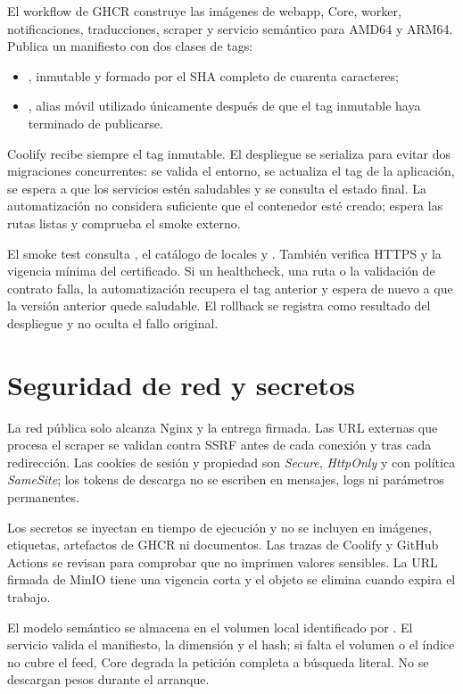 El workflow de GHCR construye las imágenes de webapp, Core, worker, notificaciones, traducciones, scraper y servicio semántico para AMD64 y ARM64. Publica un manifiesto con dos clases de tags:

\begin{itemize}
  \item {}, inmutable y formado por el SHA completo de cuarenta caracteres;
  \item {}, alias móvil utilizado únicamente después de que el tag inmutable haya terminado de publicarse.
\end{itemize}

Coolify recibe siempre el tag inmutable. El despliegue se serializa para evitar dos migraciones concurrentes: se valida el entorno, se actualiza el tag de la aplicación, se espera a que los servicios estén saludables y se consulta el estado final. La automatización no considera suficiente que el contenedor esté creado; espera las rutas listas y comprueba el smoke externo.

El smoke test consulta , el catálogo de locales y . También verifica HTTPS y la vigencia mínima del certificado. Si un healthcheck, una ruta o la validación de contrato falla, la automatización recupera el tag anterior y espera de nuevo a que la versión anterior quede saludable. El rollback se registra como resultado del despliegue y no oculta el fallo original.

\section{Seguridad de red y secretos}

La red pública solo alcanza Nginx y la entrega firmada. Las URL externas que procesa el scraper se validan contra SSRF antes de cada conexión y tras cada redirección. Las cookies de sesión y propiedad son \emph{Secure}, \emph{HttpOnly} y con política \emph{SameSite}; los tokens de descarga no se escriben en mensajes, logs ni parámetros permanentes.

Los secretos se inyectan en tiempo de ejecución y no se incluyen en imágenes, etiquetas, artefactos de GHCR ni documentos. Las trazas de Coolify y GitHub Actions se revisan para comprobar que no imprimen valores sensibles. La URL firmada de MinIO tiene una vigencia corta y el objeto se elimina cuando expira el trabajo.

El modelo semántico se almacena en el volumen local identificado por . El servicio valida el manifiesto, la dimensión y el hash; si falta el volumen o el índice no cubre el feed, Core degrada la petición completa a búsqueda literal. No se descargan pesos durante el arranque.

